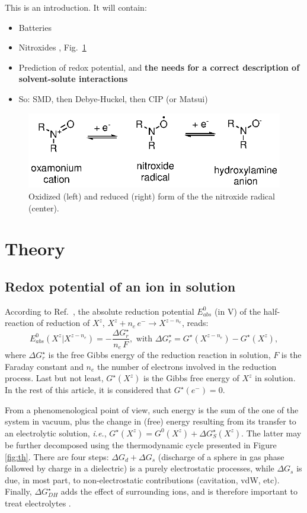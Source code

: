 \documentclass[review]{elsarticle}
\begin{document}
This is an introduction. It will contain:\begin{itemize}
	\item Batteries
	\item Nitroxides \cite{souleChemistryBiologyNitroxide2007}, Fig.~\ref{fig:states}
	\item Prediction of redox potential, and \textbf{the needs for a correct description of solvent-solute interactions}
	\item So: SMD, then Debye-Huckel, then CIP (or Matsui)
\end{itemize}

\begin{figure}[!h]
	\centering
	\includegraphics[width=.5\linewidth]{Figure1}
	\caption{Oxidized (left) and reduced (right) form of the the nitroxide radical (center).}
	\label{fig:states}
\end{figure}

\section{Theory}

\subsection{Redox potential of an ion in solution}

According to Ref.~\cite{marenichComputationalElectrochemistryPrediction2014}, the absolute reduction potential $E_{abs}^0$ (in \si{\volt}) of the half-reaction of reduction of $X^z$, $X^{z} + n_e\,e^- \rightarrow X^{z-n_e}$, reads: \begin{equation}
	E_{abs}^0(X^{z}|X^{z-n_e}) = -\frac{\Delta G_{r}^\star}{n_e\,F}, \text{ with } \Delta G_{r}^\star = G^\star(X^{z-n_e}) - G^\star(X^z), \label{eq:nernst}
\end{equation}
where $\Delta G_{r}^\star$ is the free Gibbs energy of the reduction reaction in solution, $F$ is the Faraday constant and $n_e$ the number of electrons involved in the reduction process. Last but not least, $G^\star(X^z)$ is the Gibbs free energy of $X^z$ in solution.  In the rest of this article, it is considered that $G^\star(e^-) = 0$.

From a phenomenological point of view, such energy is the sum of the one of the system in vacuum, plus the change in (free) energy resulting from its transfer to an electrolytic solution, \textit{i.e.}, $G^\star(X^z) = G^0(X^z)+ \Delta G_S^\star(X^z)$. The latter may be further decomposed using the thermodynamic cycle presented in Figure \ref{fig:th}. There are four steps: $\Delta G_d + \Delta G_s$ (discharge of a sphere in gas phase followed by charge in a dielectric) is a purely electrostatic processes, while $\Delta G_s$ is due, in most part, to non-electrostatic contributions (cavitation, vdW, etc). Finally, $\Delta G^\star_{DH}$ adds the effect of surrounding ions, and is therefore important to treat electrolytes \cite{silvaImprovingBornEquation2024}.
\end{document}

